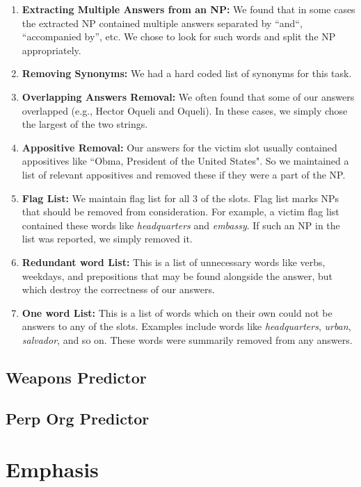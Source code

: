 \documentclass[11pt]{myclass}
\begin{document}
\begin{enumerate}

\item \textbf{Extracting Multiple Answers from an NP:} We found that in some cases the extracted NP contained multiple answers separated by “and“, “accompanied by”, etc. We chose to look for such words and split the NP appropriately.
\item \textbf{Removing Synonyms:} We had a hard coded list of synonyms for this task. 
\item \textbf{Overlapping Answers Removal:} We often found that some of our answers overlapped (e.g., Hector Oqueli and Oqueli). In these cases, we simply chose the largest of the two strings.
\item \textbf{Appositive Removal:} Our answers for the victim slot usually contained appositives like ``Obma, President of the United States". So we maintained a list of relevant appositives and removed these if they were a part of the NP.
\item \textbf{Flag List:} We maintain flag list for all 3 of the slots. Flag list marks NPs that should be removed from consideration. For example, a victim flag list contained these words like \textit{headquarters} and \textit{embassy}. If such an NP in the list was reported, we simply removed it.
\item \textbf{Redundant word List:} This is a list of unnecessary words like verbs, weekdays, and prepositions that may be found alongside the answer, but which destroy the correctness of our answers.
\item \textbf{One word List:} This is a list of words which on their own could not be answers to any of the slots. Examples include words like \textit{headquarters}, \textit{urban}, \textit{salvador}, and so on. These words were summarily removed from any answers.

\end{enumerate}

\subsection*{Weapons Predictor}

\subsection*{Perp Org Predictor}

\section{Emphasis}
\end{document}
